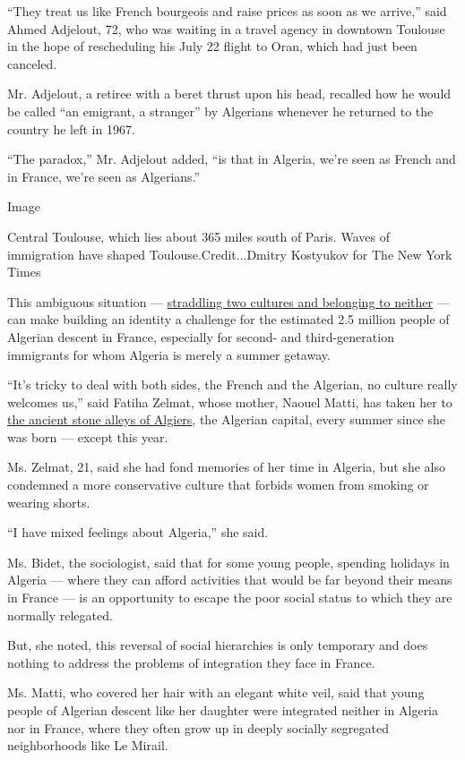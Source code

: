``They treat us like French bourgeois and raise prices as soon as we
arrive,'' said Ahmed Adjelout, 72, who was waiting in a travel agency in
downtown Toulouse in the hope of rescheduling his July 22 flight to
Oran, which had just been canceled.

Mr. Adjelout, a retiree with a beret thrust upon his head, recalled how
he would be called ``an emigrant, a stranger'' by Algerians whenever he
returned to the country he left in 1967.

``The paradox,'' Mr. Adjelout added, ``is that in Algeria, we're seen as
French and in France, we're seen as Algerians.''

Image

Central Toulouse, which lies about 365 miles south of Paris. Waves of
immigration have shaped Toulouse.Credit...Dmitry Kostyukov for The New
York Times

This ambiguous situation ---
\href{https://www.nytimes3xbfgragh.onion/2015/08/16/world/africa/france-algeria-immigration-discrimination-racism.html}{straddling
two cultures and belonging to neither} --- can make building an identity
a challenge for the estimated 2.5 million people of Algerian descent in
France, especially for second- and third-generation immigrants for whom
Algeria is merely a summer getaway.

``It's tricky to deal with both sides, the French and the Algerian, no
culture really welcomes us,'' said Fatiha Zelmat, whose mother, Naouel
Matti, has taken her to
\href{https://www.nytimes3xbfgragh.onion/2019/05/05/world/africa/algeria-casbah-preservation-plan.html}{the
ancient stone alleys of Algiers}, the Algerian capital, every summer
since she was born --- except this year.

Ms. Zelmat, 21, said she had fond memories of her time in Algeria, but
she also condemned a more conservative culture that forbids women from
smoking or wearing shorts.

``I have mixed feelings about Algeria,'' she said.

Ms. Bidet, the sociologist, said that for some young people, spending
holidays in Algeria --- where they can afford activities that would be
far beyond their means in France --- is an opportunity to escape the
poor social status to which they are normally relegated.

But, she noted, this reversal of social hierarchies is only temporary
and does nothing to address the problems of integration they face in
France.

Ms. Matti, who covered her hair with an elegant white veil, said that
young people of Algerian descent like her daughter were integrated
neither in Algeria nor in France, where they often grow up in deeply
socially segregated neighborhoods like Le Mirail.

